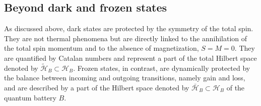 \documentclass[aps,superscriptaddress,twocolumn,pre,longbibliography,floatfix]{revtex4-1}
\begin{document}
	
	\subsection{Beyond dark and frozen states}
	
	As discussed above, dark states are protected by the symmetry of the total spin. They are not thermal phenomena but are directly linked to the annihilation of the total spin momentum and to the absence of magnetization, $S=M=0$. They are quantified by Catalan numbers and represent a part of the total Hilbert space denoted by $\tilde{\mathcal{H}}_B \subset \mathcal{H}_B$. Frozen states, in contrast, are dynamically protected by the balance between incoming and outgoing transitions, namely gain and loss, and are described by a part of the Hilbert space denoted by $\bar{\mathcal{H}}_B \subset \mathcal{H}_B$ of the quantum battery $B$.
	
\end{document}
